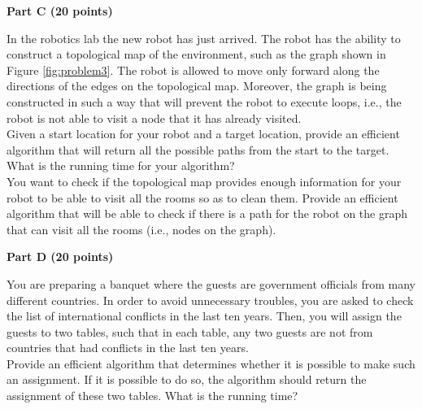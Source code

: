 \documentclass{article}
\begin{document}
\begin{center}
{\bf Part C (20 points)}
\end{center}


 In the robotics lab the new robot has just
arrived. The robot has the ability to construct a topological map of
the environment, such as the graph shown in Figure
\ref{fig:problem3}. The robot is allowed to move only forward along
the directions of the edges on the topological map. Moreover, the
graph is being constructed in such a way that will prevent the robot
to execute loops, i.e., the robot is not able to visit a node that it
has already visited.\\

 Given a start location for your robot and a target
location, provide an efficient algorithm that will return all the
possible paths from the start to the target.  What is the running time
for your algorithm?\\

 You want to check if the topological map provides
enough information for your robot to be able to visit all the rooms so
as to clean them. Provide an efficient algorithm that will be able to
check if there is a path for the robot on the graph that can visit all
the rooms (i.e., nodes on the graph).\\

\begin{center}
{\bf Part D (20 points)}
\end{center}

 You are preparing a banquet where the
guests are government officials from many different countries. In
order to avoid unnecessary troubles, you are asked to check the list
of international conflicts in the last ten years. Then, you will
assign the guests to two tables, such that in each table, any two
guests are not from countries that had conflicts in the last ten
years.\\

\noindent Provide an efficient algorithm that determines whether it is
possible to make such an assignment. If it is possible to do so, the
algorithm should return the assignment of these two tables. What is
the running time?\\
\end{document}
